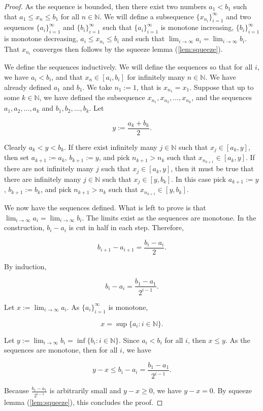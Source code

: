 \documentclass[../main.tex]{subfiles}
\begin{document}
    \begin{proof}
        As the sequence is bounded, then there exist two numbers $a_1 < b_1$ such that $a_1 \leq x_n \leq b_1$ for all $n \in \mathbb{N}$. We will define a subsequence $\{x_{n_i}\}_{i=1}^{\infty}$ and two sequences $\{a_i\}_{i=1}^{\infty}$ and $\{b_i\}_{i=1}^{\infty}$ such that $\{a_i\}_{i=1}^{\infty}$ is monotone increasing, $\{b_i\}_{i=1}^{\infty}$ is monotone decreasing, $a_i \leq x_{n_i} \leq b_i$ and such that $\lim_{i \to \infty} a_i = \lim_{i \to \infty} b_i$. That $x_{n_i}$ converges then follows by the squeeze lemma (\ref{lem:squeeze}).

We define the sequences inductively. We will define the sequences so that for all $i$, we have $a_i < b_i$, and that $x_n \in [a_i, b_i]$ for infinitely many $n \in \mathbb{N}$. We have already defined $a_1$ and $b_1$. We take $n_1 := 1$, that is $x_{n_1} = x_1$. Suppose that up to some $k \in \mathbb{N}$, we have defined the subsequence $x_{n_1}, x_{n_2}, \dots, x_{n_k}$, and the sequences $a_1, a_2, \dots, a_k$ and $b_1, b_2, \dots, b_k$. Let 

\[
y := \frac{a_k + b_k}{2}.
\]

Clearly $a_k < y < b_k$. If there exist infinitely many $j \in \mathbb{N}$ such that $x_j \in [a_k, y]$, then set $a_{k+1} := a_k$, $b_{k+1} := y$, and pick $n_{k+1} > n_k$ such that $x_{n_{k+1}} \in [a_k, y]$. If there are not infinitely many $j$ such that $x_j \in [a_k, y]$, then it must be true that there are infinitely many $j \in \mathbb{N}$ such that $x_j \in [y, b_k]$. In this case pick $a_{k+1} := y$, $b_{k+1} := b_k$, and pick $n_{k+1} > n_k$ such that $x_{n_{k+1}} \in [y, b_k]$.

We now have the sequences defined. What is left to prove is that $\lim_{i \to \infty} a_i = \lim_{i \to \infty} b_i$. The limits exist as the sequences are monotone. In the construction, $b_i - a_i$ is cut in half in each step. Therefore, 

\[
b_{i+1} - a_{i+1} = \frac{b_i - a_i}{2}.
\]

By induction,

\[
b_i - a_i = \frac{b_1 - a_1}{2^{i-1}}.
\]

Let $x := \lim_{i \to \infty} a_i$. As $\{a_i\}_{i=1}^{\infty}$ is monotone,

\[
x = \sup \{a_i : i \in \mathbb{N}\}.
\]

Let $y := \lim_{i \to \infty} b_i = \inf \{b_i : i \in \mathbb{N}\}$. Since $a_i < b_i$ for all $i$, then $x \leq y$. As the sequences are monotone, then for all $i$, we have

\[
y - x \leq b_i - a_i = \frac{b_1 - a_1}{2^{i-1}}.
\]

Because $\frac{b_1 - a_1}{2^{i-1}}$ is arbitrarily small and $y - x \geq 0$, we have $y - x = 0$. By squeeze lemma (\ref{lem:squeeze}), this concludes the proof.
    \end{proof}
    
\end{document}
